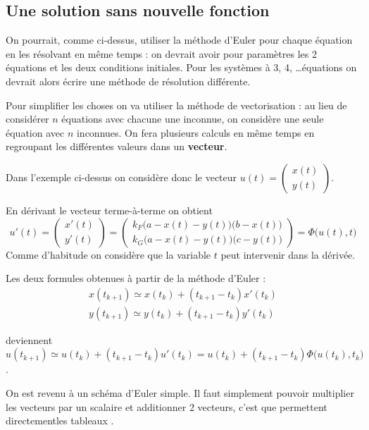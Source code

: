 \subsection{Une solution sans nouvelle fonction}
On pourrait, comme ci-dessus, utiliser la méthode d'Euler pour chaque équation en les résolvant en même temps : on devrait avoir pour paramètres les 2 équations et les deux conditions initiales. Pour les systèmes à 3, 4, \dots équations on devrait alors écrire une méthode de résolution différente.

Pour simplifier les choses on va utiliser la méthode de vectorisation : au lieu de considérer $n$ équations avec chacune une inconnue, on considère une seule équation avec $n$ inconnues. On fera plusieurs calculs en même temps en regroupant les différentes valeurs dans un {\bf vecteur}.

Dans l'exemple ci-dessus on considère donc le vecteur $u(t) = \begin{pmatrix} x(t)\\ y(t) \end{pmatrix}$.

En dérivant le vecteur terme-à-terme on obtient 
\[u'(t) 
= \begin{pmatrix} x'(t)\\ y'(t) \end{pmatrix}
= \begin{pmatrix}k_F\bigl(a - x(t) - y(t)\bigr)\bigl(b-x(t)\bigr)\\
k_G\bigl(a - x(t) - y(t)\bigr)\bigl(c-y(t)\bigr)\end{pmatrix}
= \Phi\bigl(u(t), t\bigr)
\]
Comme d'habitude on considère que la variable $t$ peut intervenir dans la dérivée.

\medskip
Les deux formules obtenues à partir de la méthode d'Euler :
\[\begin{matrix} x(t_{k+1}) \simeq x(t_k) + (t_{k+1}-t_k)x'(t_k)\\
y(t_{k+1}) \simeq y(t_k) + (t_{k+1}-t_k)y'(t_k)\end{matrix}
\]

deviennent $u(t_{k+1}) \simeq u(t_k) + (t_{k+1}-t_k)u'(t_k)=
u(t_k) + (t_{k+1}-t_k)\Phi\bigl(u(t_k), t_k\bigr)$.

On est revenu à un schéma d'Euler simple. Il faut simplement pouvoir multiplier les vecteurs par un scalaire et additionner 2 vecteurs, c'est que permettent directementles tableaux .

